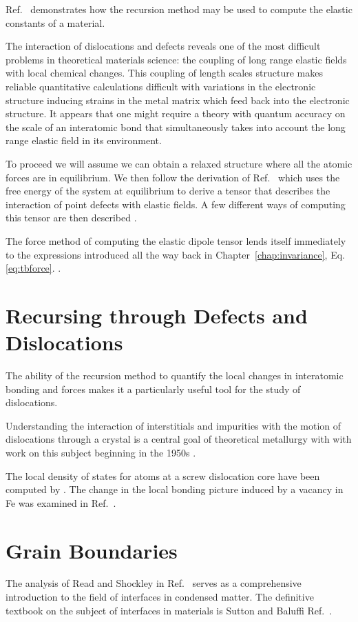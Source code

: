 Ref.~\cite{terakura84} demonstrates how the recursion method
may be used to compute the elastic constants of a material.

The interaction of dislocations and defects reveals one of the most difficult problems
in theoretical materials science: the coupling of long range elastic fields
with local chemical changes. This coupling of length scales structure makes
reliable quantitative calculations difficult with variations in the electronic structure
inducing strains in the metal matrix which feed back into the electronic structure. 
It appears that one might require a theory with quantum accuracy on the scale of an 
interatomic bond that simultaneously takes into account the long range elastic 
field in its environment.

To proceed we will assume we can obtain a relaxed structure where all the atomic forces are
in equilibrium. We then follow the derivation of Ref.~\cite{freedman09} which uses the free energy
of the system at equilibrium to derive a tensor that describes the interaction of point defects 
with elastic fields. A few different ways of computing this tensor are then described \cite{nazarov16}.

The force method of computing the elastic dipole tensor lends itself 
immediately to the expressions introduced all the way back in 
Chapter~\ref{chap:invariance}, Eq.\ref{eq:tbforce}. \cite{paxton90}.

\section{Recursing through Defects and Dislocations}
The ability of the recursion method to quantify the local changes in interatomic bonding and
forces makes it a particularly useful tool for the study of dislocations. 

Understanding the interaction of interstitials and impurities with the motion of
dislocations through a crystal is a central goal of theoretical metallurgy with
with work on this subject beginning in the 1950s \cite{cochardt55}.

The local density of states for atoms at a screw dislocation core have been computed by \cite{paidar81,masuda81}. 
The change in the local bonding picture induced by a vacancy in Fe was examined in Ref.~\cite{masuda82,ohta87}.

\section{Grain Boundaries}
The analysis of Read and Shockley in Ref.~\cite{read50} serves as a comprehensive
introduction to the field of interfaces in condensed matter. The definitive textbook
on the subject of interfaces in materials is Sutton and Baluffi Ref.~\cite{sutton95}.

